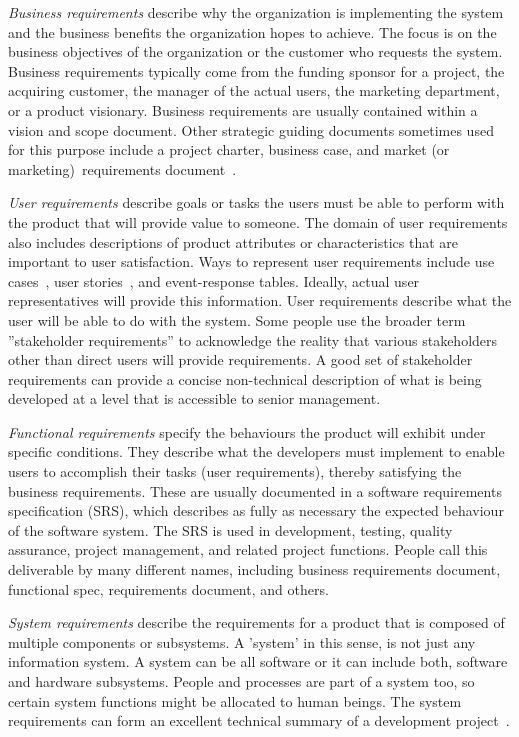 \documentclass[dissertation,final]{softeng}
\begin{document}
\emph{Business requirements} describe why the organization is implementing the system and the business benefits the organization hopes to achieve. The focus is on the business objectives of the organization or the customer who requests the system. Business requirements typically come from the funding sponsor for a project, the acquiring customer, the manager of the actual users, the marketing department, or a product visionary. Business requirements are usually contained within a vision and scope document. Other strategic guiding documents sometimes used for this purpose include a project charter, business case, and market (or marketing)~\mbox{requirements} document~\citep{Wiegers2013}.

\emph{User requirements} describe goals or tasks the users must be able to perform with the product that will provide value to someone. The domain of user requirements also includes descriptions of product attributes or characteristics that are important to user satisfaction. Ways to represent user requirements include use cases~\citep{cockburn2000writing}, user stories~\citep{cohn2004user}, and event-response tables. Ideally, actual user representatives will provide this information. User requirements describe what the user will be able to do with the system. Some people use the broader term ''stakeholder requirements'' to acknowledge the reality that various stakeholders other than direct users will provide requirements. A good set of stakeholder requirements can provide a concise non-technical description of what is being developed at a level that is accessible to senior management.

\emph{Functional requirements} specify the behaviours the product will exhibit under specific conditions. They describe what the developers must implement to enable users to accomplish their tasks (user requirements), thereby satisfying the business requirements. These are usually documented in a software requirements specification (SRS), which describes as fully as necessary the expected behaviour of the software system. The SRS is used in development, testing, quality assurance, project management, and related project functions. People call this deliverable by many different names, including business requirements document, functional spec, requirements document, and others.

\emph{System requirements} describe the requirements for a product that is composed of multiple components or subsystems. A 'system' in this sense, is not just any information system. A system can be all software or it can include both, software and hardware subsystems. People and processes are part of a system too, so certain system functions might be allocated to human beings. The system requirements can form an excellent technical summary of a development project~\citep{Hull2011}.
\end{document}

